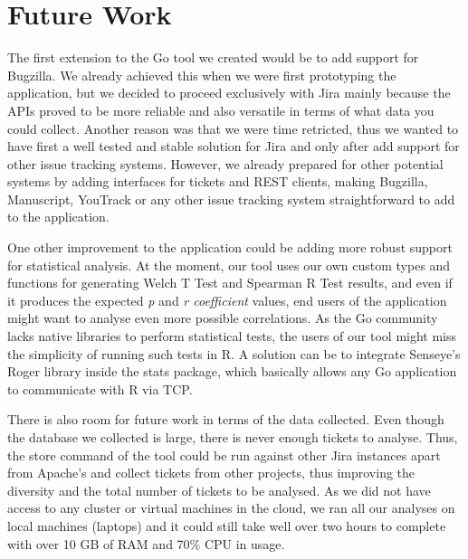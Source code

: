\documentclass{mpaper}
\begin{document}
\section{Future Work}\label{future_work}

The first extension to the Go tool we created would be to add support for Bugzilla. We already achieved this 
when we were first prototyping the application, but we decided to proceed exclusively with Jira mainly because 
the APIs proved to be more reliable and also versatile in terms of what data you could collect. Another 
reason was that we were time retricted, thus we wanted to have first a well tested and stable solution for Jira and 
only after add support for other issue tracking systems. However, we already prepared for other potential systems by 
adding interfaces for tickets and REST clients, making Bugzilla, Manuscript, YouTrack or any 
other issue tracking system straightforward to add to the application.

One other improvement to the application could be adding more robust support for statistical analysis. At the moment, 
our tool uses our own custom types and functions for generating Welch T Test and Spearman R Test results, and even if 
it produces the expected \emph{p} and \emph{r coefficient} values, end users of the application might want to 
analyse even more possible correlations. As the Go community lacks native libraries to perform statistical tests, 
the users of our tool might miss the simplicity of running such tests in R. A solution can be to integrate Senseye's 
Roger library \cite{r_stats} inside the stats package, which basically allows any Go application to communicate with 
R via TCP. 

There is also room for future work in terms of the data collected. Even though the database we collected 
is large, there is never enough tickets to analyse. Thus, the store command of the tool could be run against 
other Jira instances apart from Apache's and collect tickets from other projects, thus improving the diversity 
and the total number of tickets to be analysed. As we did not have access to any cluster or virtual machines in 
the cloud, we ran all our analyses on local machines (laptops) and it could still take well over two hours to complete 
with over 10 GB of RAM and 70\% CPU in usage.
\end{document}
